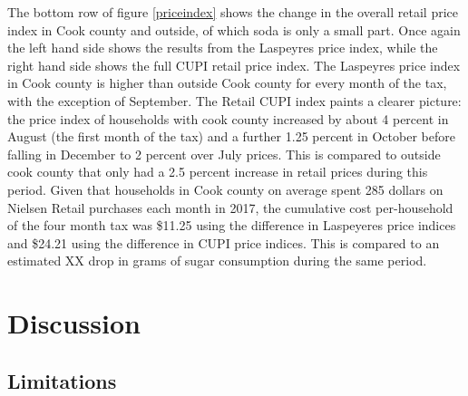 \documentclass[12pt]{article}
\begin{document}
The bottom row of figure \ref{priceindex} shows the change in the overall retail price index in Cook county and outside, of which soda is only a small part. Once again the left hand side shows the results from the Laspeyres price index, while the right hand side shows the full CUPI retail price index. The Laspeyres price index in Cook county is higher than outside Cook county for every month of the tax, with the exception of September. The Retail CUPI index paints a clearer picture: the price index of households with cook county increased by about 4 percent in August (the first month of the tax) and a further 1.25 percent in October before falling in December to 2 percent over July prices. This is compared to outside cook county that only had a 2.5 percent increase in retail prices during this period. Given that households in Cook county on average spent 285 dollars on Nielsen Retail purchases each month in 2017, the cumulative cost per-household of the four month tax was \$11.25 using the difference in Laspeyeres price indices and \$24.21 using the difference in CUPI price indices. This is compared to an estimated XX drop in grams of sugar consumption during the same period.



\section{Discussion} \label{discussion}



\subsection{Limitations}
\end{document}
